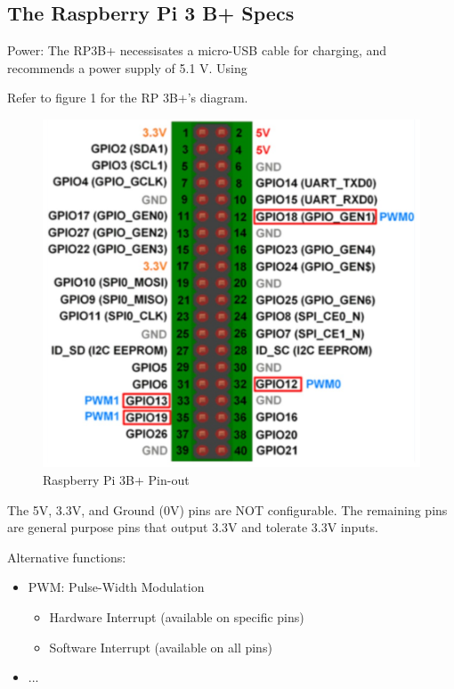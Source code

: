 \documentclass[a4paper, 10pt]{article}
\begin{document}
    \subsection{The Raspberry Pi 3 B+ Specs}
            Power:
            The RP3B+ necessisates a micro-USB cable for charging, and recommends a power supply of 5.1 V. Using  
  
            Refer to figure 1 for the RP 3B+'s  diagram.
            \begin{figure}[h]
                \centering
                \includegraphics[width=\textwidth]{media/rp_3bp_pinout.jpg}
                \caption{Raspberry Pi 3B+ Pin-out}
                \label{fig:rp_3bp_pinout}
            \end{figure}

            The 5V, 3.3V, and Ground (0V) pins are NOT configurable. The remaining pins are general purpose pins that output 3.3V and tolerate 3.3V inputs.

            Alternative functions:
            \begin{itemize}
                \item PWM: Pulse-Width Modulation 
                \begin{itemize}
                    \item Hardware Interrupt (available on specific pins)
                    \item Software Interrupt (available on all pins)
                \end{itemize}
                \item ...
            \end{itemize}
\end{document}
